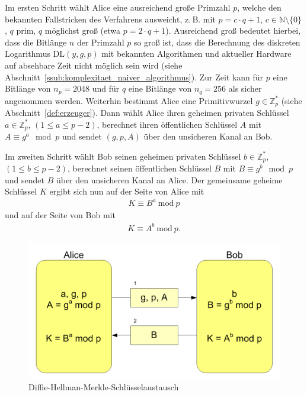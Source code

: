 \documentclass[
  a4paper,
  11pt,
]{scrartcl}
\theoremstyle{plain}
\theoremstyle{definition}
\theoremstyle{remark}
\newcommand{\N}{\mathbb{N}}
\newcommand{\Z}{\mathbb{Z}}
\newcommand{\Mod}[1]{\ \mathrm{mod}\ #1}
\begin{document}
Im ersten Schritt wählt Alice eine ausreichend große Primzahl $p$, welche den
bekannten Fallstricken des Verfahrens ausweicht, z.\,B. mit $p = c \cdot q+1$,
$c \in \N \setminus \{ 0 \}$, $q$ prim, $q$ möglichst groß (etwa
$p = 2 \cdot q + 1$).
Ausreichend groß bedeutet hierbei, dass die Bitlänge $n$ der Primzahl $p$
so groß ist, dass die Berechnung des diskreten Logarithmus $\text{DL}(y,g,p)$
mit bekannten Algorithmen und aktueller Hardware auf absehbare Zeit nicht
möglich sein wird (siehe Abschnitt~\ref{ssub:komplexitaet_naiver_algorithmus}).
Zur Zeit kann für $p$ eine Bitlänge von $n_p = 2048$ und für $q$ eine Bitlänge
von $n_q = 256$ als sicher angenommen werden.
Weiterhin bestimmt Alice eine Primitivwurzel $g \in \Z_p^*$ (siehe
Abschnitt~\ref{def:erzeuger}).
Dann wählt Alice ihren geheimen privaten Schlüssel
$a \in \Z_p^*$, $(1 \leq a \leq p-2)$, berechnet ihren öffentlichen Schlüssel
$A$ mit $A \equiv g^a \mod p$ und sendet $(g, p, A)$ über den unsicheren Kanal
an Bob.

Im zweiten Schritt wählt Bob seinen geheimen privaten Schlüssel $b \in \Z_p^*$,
$(1 \leq b \leq p-2)$, berechnet seinen öffentlichen Schlüssel $B$ mit
$B \equiv g^b \mod p$ und sendet $B$ über den unsicheren Kanal an Alice.
Der gemeinsame geheime Schlüssel $K$ ergibt sich nun auf der Seite von Alice mit
\begin{align*}
  K \equiv B^a \Mod{p}
\end{align*}
und auf der Seite von Bob mit
\begin{align*}
  K \equiv A^b \Mod{p} \text{.}
\end{align*}

\begin{figure}[H]
  \centering
  \includegraphics[width=\textwidth]{Diffie-Hellman-Schluesselaustausch2.png}
  \caption{Diffie-Hellman-Merkle-Schlüsselaustausch}
  \label{fig:dhke}
\end{figure}
\end{document}
